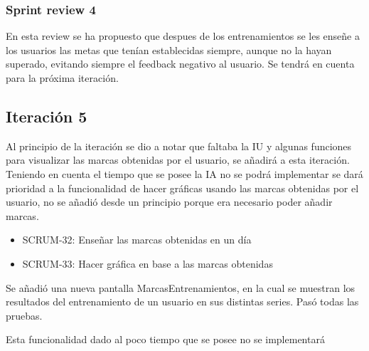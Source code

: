 \subsubsection{Sprint review 4}

En esta review se ha propuesto que despues de los entrenamientos se les enseñe a los usuarios las metas que tenían establecidas siempre, aunque no la hayan superado, evitando siempre el feedback negativo al usuario. Se tendrá en cuenta para la próxima iteración.

\subsection{Iteración 5}

Al principio de la iteración se dio a notar que faltaba la IU y algunas funciones para visualizar las marcas obtenidas por el usuario, se añadirá a esta iteración. Teniendo en cuenta el tiempo que se posee la IA no se podrá implementar se dará prioridad a la funcionalidad de hacer gráficas usando las marcas obtenidas por el usuario, no se añadió desde un principio porque era necesario poder añadir marcas.

\begin{itemize}
	\item SCRUM-32: Enseñar las marcas obtenidas en un día
	\item SCRUM-33: Hacer gráfica en base a las marcas obtenidas
\end{itemize}


Se añadió una nueva pantalla MarcasEntrenamientos, en la cual se muestran los resultados del entrenamiento de un usuario en sus distintas series. Pasó todas las pruebas.


Esta funcionalidad dado al poco tiempo que se posee no se implementará